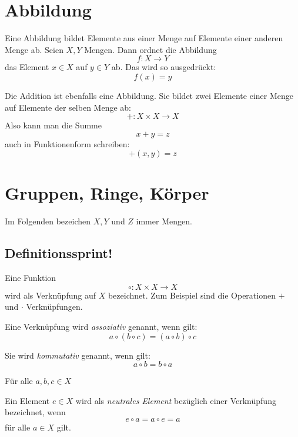 \begin{definition}

\end{definition}

\section{Abbildung}

Eine Abbildung bildet Elemente aus einer Menge auf Elemente einer anderen Menge ab. Seien $X,Y$ Mengen. Dann ordnet die Abbildung
\[ f : X \longrightarrow Y \]
das Element $x\in X$ auf $y\in Y$ ab. Das wird so ausgedrückt:
\[ f(x) = y\]

Die Addition ist ebenfalls eine Abbildung. Sie bildet zwei Elemente einer Menge auf Elemente der selben Menge ab:
\[ + : X \times X \longrightarrow X \]
Also kann man die Summe 
\[ x+y = z\]
auch in Funktionenform schreiben:
\[ +(x,y) = z\]

\section{Gruppen, Ringe, Körper}
Im Folgenden bezeichen $X,Y$ und $Z$ immer Mengen.

\subsection{Definitionssprint!}

\begin{definition}
Eine Funktion
\[ \circ : X \times X \longrightarrow X \]
wird als Verknüpfung auf $X$ bezeichnet. Zum Beispiel sind die Operationen $+$ und $\cdot$ Verknüpfungen. 
\end{definition}

\begin{definition}
Eine Verknüpfung wird \textsl{assoziativ} genannt, wenn gilt:
\[ a \circ (b \circ c) = (a \circ b) \circ c \]
\end{definition}
\begin{definition}
Sie wird \textsl{kommutativ} genannt, wenn gilt: 
\[ a \circ b = b \circ a \]
\end{definition}
Für alle $a,b,c \in X$

\begin{definition}
Ein Element $e\in X$ wird als \textsl{neutrales Element} bezüglich einer Verknüpfung bezeichnet, wenn 
\[ e\circ a = a \circ e = a \]
für alle $a\in X$ gilt.
\end{definition}


